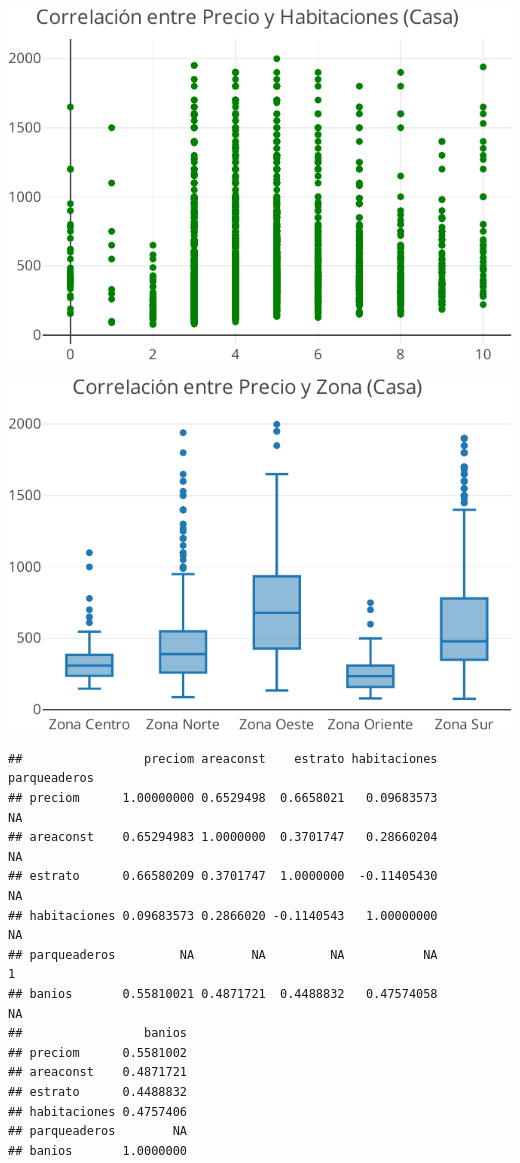 \documentclass[
]{article}
\begin{document}
\includegraphics{A2_U2_InformeEjecutivo_files/figure-latex/unnamed-chunk-14-4.pdf}

\includegraphics{A2_U2_InformeEjecutivo_files/figure-latex/unnamed-chunk-15-1.pdf}

\begin{verbatim}
##                 preciom areaconst    estrato habitaciones parqueaderos
## preciom      1.00000000 0.6529498  0.6658021   0.09683573           NA
## areaconst    0.65294983 1.0000000  0.3701747   0.28660204           NA
## estrato      0.66580209 0.3701747  1.0000000  -0.11405430           NA
## habitaciones 0.09683573 0.2866020 -0.1140543   1.00000000           NA
## parqueaderos         NA        NA         NA           NA            1
## banios       0.55810021 0.4871721  0.4488832   0.47574058           NA
##                 banios
## preciom      0.5581002
## areaconst    0.4871721
## estrato      0.4488832
## habitaciones 0.4757406
## parqueaderos        NA
## banios       1.0000000
\end{verbatim}
\end{document}
